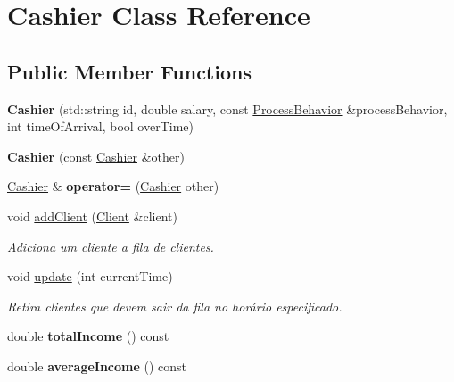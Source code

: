 \hypertarget{classCashier}{\section{Cashier Class Reference}
\label{classCashier}
}
\subsection*{Public Member Functions}
\begin{DoxyCompactItemize}
\item 
\hypertarget{classCashier_ae0b9b991bed233e91d802ed24a1689a0}{{\bfseries Cashier} (std\-::string id, double salary, const \hyperlink{classProcessBehavior}{Process\-Behavior} \&process\-Behavior, int time\-Of\-Arrival, bool over\-Time)}\label{classCashier_ae0b9b991bed233e91d802ed24a1689a0}

\item 
\hypertarget{classCashier_aa3438cc7699379f97fb86204cee96f3b}{{\bfseries Cashier} (const \hyperlink{classCashier}{Cashier} \&other)}\label{classCashier_aa3438cc7699379f97fb86204cee96f3b}

\item 
\hypertarget{classCashier_ae50bc394e4ac4ee80817aff2b8ecd846}{\hyperlink{classCashier}{Cashier} \& {\bfseries operator=} (\hyperlink{classCashier}{Cashier} other)}\label{classCashier_ae50bc394e4ac4ee80817aff2b8ecd846}

\item 
void \hyperlink{classCashier_a8a0e504ffb0178331eac83900182de06}{add\-Client} (\hyperlink{classClient}{Client} \&client)
\begin{DoxyCompactList}\small\item\em Adiciona um cliente a fila de clientes. \end{DoxyCompactList}\item 
void \hyperlink{classCashier_ae84eef690ba7beb9c38e1813bf4a4934}{update} (int current\-Time)
\begin{DoxyCompactList}\small\item\em Retira clientes que devem sair da fila no horário especificado. \end{DoxyCompactList}\item 
\hypertarget{classCashier_a21fec12d0be5f4ae5f530ff0ee0d6c6e}{double {\bfseries total\-Income} () const }\label{classCashier_a21fec12d0be5f4ae5f530ff0ee0d6c6e}

\item 
\hypertarget{classCashier_aef70a7f98c9049e74830abdc3ef16e48}{double {\bfseries average\-Income} () const }\label{classCashier_aef70a7f98c9049e74830abdc3ef16e48}


\end{DoxyCompactItemize}
